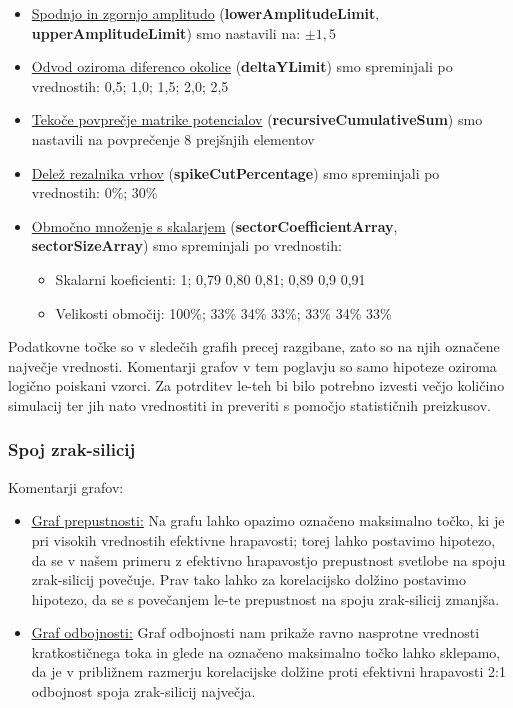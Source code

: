 \documentclass[a4paper,twoside,openright,12pt,slovene]{book}
\begin{document}
\begin{itemize}
    \item \underline{Spodnjo in zgornjo amplitudo} (\textbf{lowerAmplitudeLimit}, \textbf{upperAmplitudeLimit}) smo nastavili na: $\pm 1,5$
    
    \item \underline{Odvod oziroma diferenco okolice} (\textbf{deltaYLimit}) smo spreminjali po vrednostih: 0,5; 1,0; 1,5; 2,0; 2,5

    \item \underline{Tekoče povprečje matrike potencialov} (\textbf{recursiveCumulativeSum}) smo nastavili na povprečenje 8 prejšnjih elementov

    \item \underline{Delež rezalnika vrhov} (\textbf{spikeCutPercentage}) smo spreminjali po vrednostih: 0\%; 30\%

    \item \underline{Območno množenje s skalarjem} (\textbf{sectorCoefficientArray}, \textbf{sectorSizeArray}) smo spreminjali po vrednostih: 
    \begin{itemize}
        \item Skalarni koeficienti: 1; 0,79 0,80 0,81; 0,89 0,9 0,91
        \item Velikosti območij: 100\%; 33\% 34\% 33\%; 33\% 34\% 33\% 
    \end{itemize}
\end{itemize}

Podatkovne točke so v sledečih grafih precej razgibane, zato so na njih označene največje vrednosti. Komentarji grafov v tem poglavju so samo hipoteze oziroma logično poiskani vzorci. Za potrditev le-teh bi bilo potrebno izvesti večjo količino simulacij ter jih nato vrednostiti in preveriti s pomočjo statističnih preizkusov.

\clearpage

\subsubsection{Spoj zrak-silicij}

Komentarji grafov:

\begin{itemize}
    \item \underline{\hyperref[fig:pre_air_si_v]{Graf prepustnosti:}} Na grafu lahko opazimo označeno maksimalno točko, ki je pri visokih vrednostih efektivne hrapavosti; torej lahko postavimo hipotezo, da se v našem primeru z efektivno hrapavostjo prepustnost svetlobe na spoju zrak-silicij povečuje. Prav tako lahko za korelacijsko dolžino postavimo hipotezo, da se s povečanjem le-te prepustnost na spoju zrak-silicij zmanjša.
    
    \item \underline{\hyperref[fig:odb_air_si_v]{Graf odbojnosti:}} Graf odbojnosti nam prikaže ravno nasprotne vrednosti kratkostičnega toka in glede na označeno maksimalno točko lahko sklepamo, da je v približnem razmerju korelacijske dolžine proti efektivni hrapavosti 2:1 odbojnost spoja zrak-silicij največja.

\end{itemize}
\end{document}
